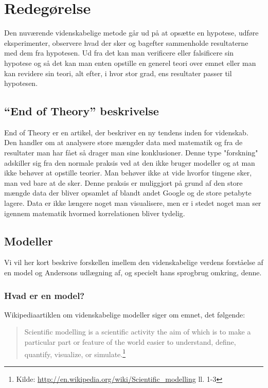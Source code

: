 \section{Redegørelse}
Den nuværende videnskabelige metode går ud på at opsætte en hypotese, udføre eksperimenter, observere hvad der sker og bagefter sammenholde resultaterne med dem fra hypotesen. Ud fra det kan man verificere eller falsificere sin hypotese og så det kan man enten opstille en generel teori over emnet eller man kan revidere sin teori, alt efter, i hvor stor grad, ens resultater passer til hypotesen. 

\subsection{``End of Theory'' beskrivelse}
End of Theory er en artikel, der beskriver en ny tendens inden for videnskab. Den handler om at analysere store mængder data med matematik og fra de resultater man har fået så drager man sine konklusioner. Denne type "forskning" adskiller sig fra den normale praksis ved at den ikke bruger modeller og at man ikke behøver at opstille teorier. Man behøver ikke at vide hvorfor tingene sker, man ved bare at de sker. Denne praksis er muliggjort på grund af den store mængde data der bliver opsamlet af blandt andet Google og de store petabyte lagere. Data er ikke længere noget man visualisere, men er i stedet noget man ser igennem matematik hvormed korrelationen bliver tydelig.

\subsection{Modeller}
Vi vil her kort beskrive forskellen imellem den videnskabelige verdens
forståelse af en model og Andersons udlægning af, og specielt hans sprogbrug
omkring, denne.

\subsubsection{Hvad er en model?}
Wikipediaartiklen om videnskabelige modeller siger om emnet, det følgende:
\begin{quote}
Scientific modelling is a scientific activity the aim of which is to make a
particular part or feature of the world easier to understand, define, quantify, visualize, or simulate.\footnote{Kilde: {\url{http://en.wikipedia.org/wiki/Scientific_modelling}} ll. 1-3}
\end{quote}

